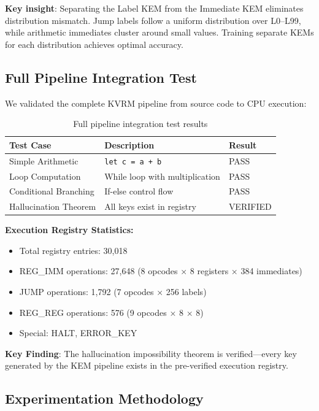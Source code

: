 \documentclass[11pt]{article}
\begin{document}
\textbf{Key insight}: Separating the Label KEM from the Immediate KEM eliminates distribution mismatch. Jump labels follow a uniform distribution over L0--L99, while arithmetic immediates cluster around small values. Training separate KEMs for each distribution achieves optimal accuracy.

\subsection{Full Pipeline Integration Test}

We validated the complete KVRM pipeline from source code to CPU execution:

\begin{table}[h]
\centering
\begin{tabular}{lll}
\toprule
\textbf{Test Case} & \textbf{Description} & \textbf{Result} \\
\midrule
Simple Arithmetic & \texttt{let c = a + b} & PASS \\
Loop Computation & While loop with multiplication & PASS \\
Conditional Branching & If-else control flow & PASS \\
Hallucination Theorem & All keys exist in registry & VERIFIED \\
\bottomrule
\end{tabular}
\caption{Full pipeline integration test results}
\end{table}

\textbf{Execution Registry Statistics:}
\begin{itemize}
    \item Total registry entries: 30,018
    \item REG\_IMM operations: 27,648 (8 opcodes × 8 registers × 384 immediates)
    \item JUMP operations: 1,792 (7 opcodes × 256 labels)
    \item REG\_REG operations: 576 (9 opcodes × 8 × 8)
    \item Special: HALT, ERROR\_KEY
\end{itemize}

\textbf{Key Finding}: The hallucination impossibility theorem is verified---every key generated by the KEM pipeline exists in the pre-verified execution registry.

\subsection{Experimentation Methodology}
\end{document}
